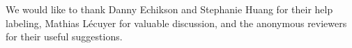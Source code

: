We would like to thank Danny Echikson and Stephanie Huang for their help labeling, Mathias L\'ecuyer for valuable discussion, and the anonymous reviewers for their useful suggestions.
\\
\\
